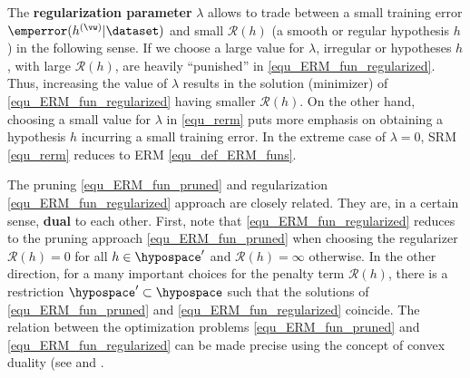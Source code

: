 \documentclass[12pt]{report}
\begin{document}
The {\bf regularization parameter} $\lambda$ allows to trade between a small training error $\emperror(h^{(\vw)}|\dataset)$ 
and small $\mathcal{R}(h)$ (a smooth or regular hypothesis $h$) in the following sense. If we choose a large value for $\lambda$, irregular 
or hypotheses $h$, with large $\mathcal{R}(h)$, are heavily ``punished'' in \eqref{equ_ERM_fun_regularized}. Thus, 
increasing the value of $\lambda$ results in the solution (minimizer) of \eqref{equ_ERM_fun_regularized} having 
smaller $\mathcal{R}(h)$. On the other hand, choosing a small value for $\lambda$ in \eqref{equ_rerm} puts more 
emphasis on obtaining a hypothesis $h$ incurring a small training error. 
In the extreme case of $\lambda =0$, SRM \eqref{equ_rerm} reduces to ERM \eqref{equ_def_ERM_funs}. 

The pruning \eqref{equ_ERM_fun_pruned} and regularization \eqref{equ_ERM_fun_regularized} 
approach are closely related. They are, in a certain sense, {\bf dual} to each other. First, note that 
\eqref{equ_ERM_fun_regularized} reduces to the pruning approach \eqref{equ_ERM_fun_pruned} when 
choosing the regularizer $\mathcal{R}(h) = 0$ for all $h \in \hypospace'$ and $\mathcal{R}(h) = \infty$ 
otherwise. In the other direction, for a many important choices for the penalty term $\mathcal{R}(h)$, 
there is a restriction $\hypospace' \subset \hypospace$ such that the solutions of \eqref{equ_ERM_fun_pruned} 
and \eqref{equ_ERM_fun_regularized} coincide. The relation between the optimization problems 
\eqref{equ_ERM_fun_pruned} and \eqref{equ_ERM_fun_regularized} can be made precise using 
the concept of convex duality (see \cite[Ch. 5]{BoydConvexBook} and \cite{BertsekasNonLinProgr}. 








%

\end{document}
